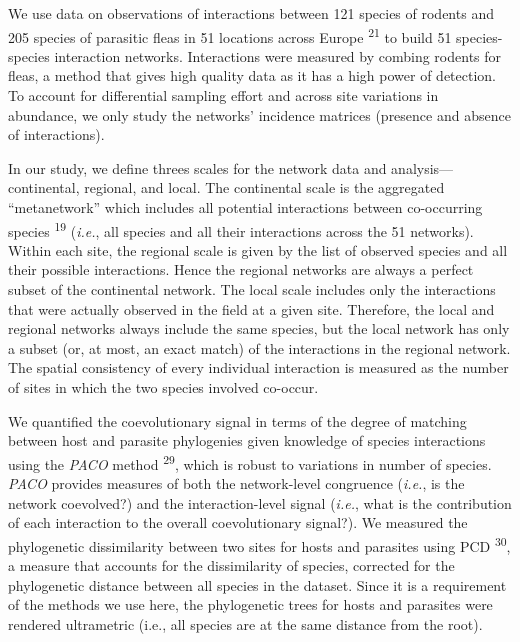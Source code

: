 \documentclass{nature}
\begin{document}
\begin{methods}

We use data on observations of interactions between 121 species of
rodents and 205 species of parasitic fleas in 51 locations across Europe
\textsuperscript{21} to build 51 species-species interaction networks.
Interactions were measured by combing rodents for fleas, a method that
gives high quality data as it has a high power of detection. To account
for differential sampling effort and across site variations in
abundance, we only study the networks' incidence matrices (presence and
absence of interactions).

In our study, we define threes scales for the network data and
analysis---continental, regional, and local. The continental scale is
the aggregated ``metanetwork'' which includes all potential interactions
between co-occurring species \textsuperscript{19} (\emph{i.e.}, all
species and all their interactions across the 51 networks). Within each
site, the regional scale is given by the list of observed species and
all their possible interactions. Hence the regional networks are always
a perfect subset of the continental network. The local scale includes
only the interactions that were actually observed in the field at a
given site. Therefore, the local and regional networks always include
the same species, but the local network has only a subset (or, at most,
an exact match) of the interactions in the regional network. The spatial
consistency of every individual interaction is measured as the number of
sites in which the two species involved co-occur.

We quantified the coevolutionary signal in terms of the degree of
matching between host and parasite phylogenies given knowledge of
species interactions using the \emph{PACO} method \textsuperscript{29},
which is robust to variations in number of species. \emph{PACO} provides
measures of both the network-level congruence (\emph{i.e.}, is the
network coevolved?) and the interaction-level signal (\emph{i.e.}, what
is the contribution of each interaction to the overall coevolutionary
signal?). We measured the phylogenetic dissimilarity between two sites
for hosts and parasites using PCD \textsuperscript{30}, a measure that
accounts for the dissimilarity of species, corrected for the
phylogenetic distance between all species in the dataset. Since it is a
requirement of the methods we use here, the phylogenetic trees for hosts
and parasites were rendered ultrametric (i.e., all species are at the
same distance from the root).

\end{methods}
\end{document}
